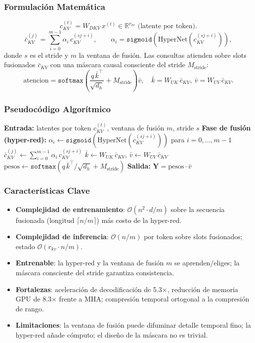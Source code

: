 \subsubsection{Formulación Matemática}
\[
c_{KV}^{(t)} = W_{DKV}\, x^{(t)} \in \mathbb{R}^{r_{kv}} \text{ (latente por token)}.
\]
\[
\bar c_{KV}^{(j)} = \sum_{i=0}^{m-1} \alpha_i\, c_{KV}^{(s j + i)}, \qquad \alpha_i = \texttt{sigmoid}(\text{HyperNet}(c_{KV}^{(s j + i)})),
\]
donde $s$ es el stride y $m$ la ventana de fusión. Las consultas atienden sobre slots fusionados $\bar c_{KV}$ con una máscara causal consciente del stride $M_{\text{stride}}$:
\[
\text{atencion} = \texttt{softmax}\!\left(\frac{q\, \bar k^\top}{\sqrt{d_h}} + M_{\text{stride}}\right) \bar v, \quad \bar k = W_{UK}\, \bar c_{KV},\ \bar v = W_{UV}\, \bar c_{KV}.
\]

\subsubsection{Pseudocódigo Algorítmico}
\begin{algorithmic}[1]
\State \textbf{Entrada:} latentes por token $c_{KV}^{(t)}$, ventana de fusión $m$, stride $s$
\State \textbf{Fase de fusión (hyper-red):}
    \State $\alpha_i \gets \texttt{sigmoid}(\text{HyperNet}(c_{KV}^{(s j + i)}))$ para $i = 0, \ldots, m-1$
    \State $\bar c_{KV}^{(j)} \gets \sum_{i=0}^{m-1} \alpha_i\, c_{KV}^{(s j + i)}$ 
\EndFor
\State $\bar k \gets W_{UK}\, \bar c_{KV}$, \quad $\bar v \gets W_{UV}\, \bar c_{KV}$
\State $\text{pesos} \gets \texttt{softmax}(q\, \bar k^\top / \sqrt{d_h} + M_{\text{stride}})$ 
\State \textbf{Salida:} $\mathbf{Y} = \text{pesos} \cdot \bar v$
\end{algorithmic}

\subsubsection{Características Clave}
\begin{itemize}[leftmargin=*]
    \item \textbf{Complejidad de entrenamiento}: $\mathcal{O}(n^2 \cdot d / m)$ sobre la secuencia fusionada (longitud $\lceil n/m \rceil$) más costo de la hyper-red.
    \item \textbf{Complejidad de inferencia}: $\mathcal{O}(n/m)$ por token sobre slots fusionados; estado $\mathcal{O}(r_{kv} \cdot n / m)$.
    \item \textbf{Entrenable}: la hyper-red y la ventana de fusión $m$ se aprenden/eliges; la máscara consciente del stride garantiza consistencia.
    \item \textbf{Fortalezas}: aceleración de decodificación de 5.3$\times$, reducción de memoria GPU de 8.3$\times$ frente a MHA; compresión temporal ortogonal a la compresión de rango.
    \item \textbf{Limitaciones}: la ventana de fusión puede difuminar detalle temporal fino; la hyper-red añade cómputo; el diseño de la máscara no es trivial.
\end{itemize}

